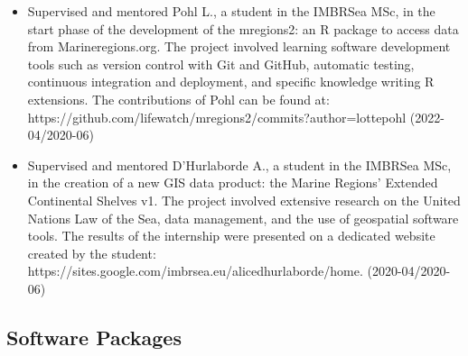 \documentclass[
  16,
]{article}
\providecommand{\tightlist}{%
  \setlength{\itemsep}{0pt}\setlength{\parskip}{0pt}}\usepackage{longtable,booktabs,array}
\begin{document}
\begin{itemize}
\tightlist
\item
  Supervised and mentored Pohl L., a student in the IMBRSea MSc, in the
  start phase of the development of the mregions2: an R package to
  access data from Marineregions.org. The project involved learning
  software development tools such as version control with Git and
  GitHub, automatic testing, continuous integration and deployment, and
  specific knowledge writing R extensions. The contributions of Pohl can
  be found at:
  https://github.com/lifewatch/mregions2/commits?author=lottepohl
  (2022-04/2020-06)
\item
  Supervised and mentored D'Hurlaborde A., a student in the IMBRSea MSc,
  in the creation of a new GIS data product: the Marine Regions'
  Extended Continental Shelves v1. The project involved extensive
  research on the United Nations Law of the Sea, data management, and
  the use of geospatial software tools. The results of the internship
  were presented on a dedicated website created by the student:
  https://sites.google.com/imbrsea.eu/alicedhurlaborde/home.
  (2020-04/2020-06)
\end{itemize}

\hypertarget{software-packages}{%
\subsection{Software Packages}\label{software-packages}}
\end{document}
